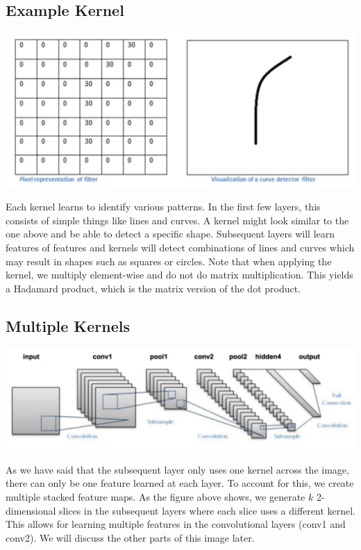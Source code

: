 \documentclass{exam}
\begin{document}
\subsection{Example Kernel}
\begin{center}
\includegraphics[scale=0.5]{filter}
\end{center}
Each kernel learns to identify various patterns. In the first few layers, this consists of simple things like lines and curves. A kernel might look similar to the one above and be able to detect a specific shape. Subsequent layers will learn features of features and kernels will detect combinations of lines and curves which may result in shapes such as squares or circles. Note that when applying the kernel, we multiply element-wise and do not do matrix multiplication. This yields a Hadamard product, which is the matrix version of the dot product.

\subsection{Multiple Kernels}
\begin{center}
\includegraphics[scale=0.7]{complete.PNG}
\end{center}
As we have said that the subsequent layer only uses one kernel across the image, there can only be one feature learned at each layer. To account for this, we create multiple stacked feature maps. As the figure above shows, we generate $k$ 2-dimensional slices in the subsequent layers where each slice uses a different kernel. This allows for learning multiple features in the convolutional layers (conv1 and conv2). We will discuss the other parts of this image later.
\end{document}
